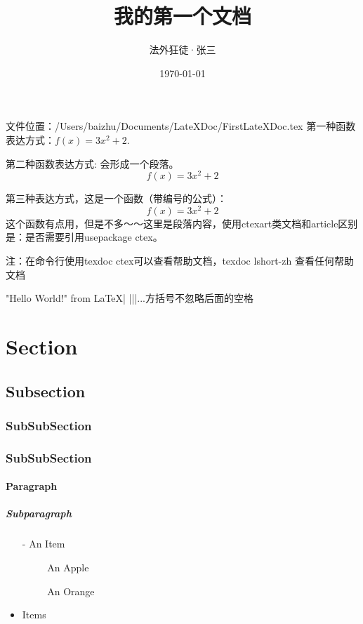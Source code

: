\documentclass{ctexart}
\title{\heiti 我的第一个文档}
\author{\kaishu 法外狂徒·张三}
\date{\today}
\begin{document}
	\maketitle
	文件位置：/Users/baizhu/Documents/LateXDoc/FirstLateXDoc.tex
	第一种函数表达方式：$f(x) = 3x^2 + 2$.
	
	第二种函数表达方式: 会形成一个段落。
	$$f(x) = 3x^2 + 2$$
	
	第三种表达方式，这是一个函数（带编号的公式）：
	\begin{equation}
		f(x) = 3x^2 + 2
	\end{equation}
	这个函数有点用，但是不多～～这里是段落内容，使用ctexart类文档和article区别是：是否需要引用usepackage ctex。
	
	注：在命令行使用texdoc ctex可以查看帮助文档，texdoc lshort-zh 查看任何帮助文档
	
	"Hello World!" from \LaTeX{}| |||...方括号不忽略后面的空格
	
	\section{Section}
	\subsection{Subsection}
	\subsubsection{SubSubSection}
	\subsubsection{SubSubSection}
	\paragraph{Paragraph}
	\subparagraph{Subparagraph}
	
	\begin{itemize}
		\item[-] An Item
		\begin{itemize}
			\item[~] An Apple
			\item[~] An Orange
		\end{itemize}
		\item Items
	\end{itemize}
	
	
\end{document}
